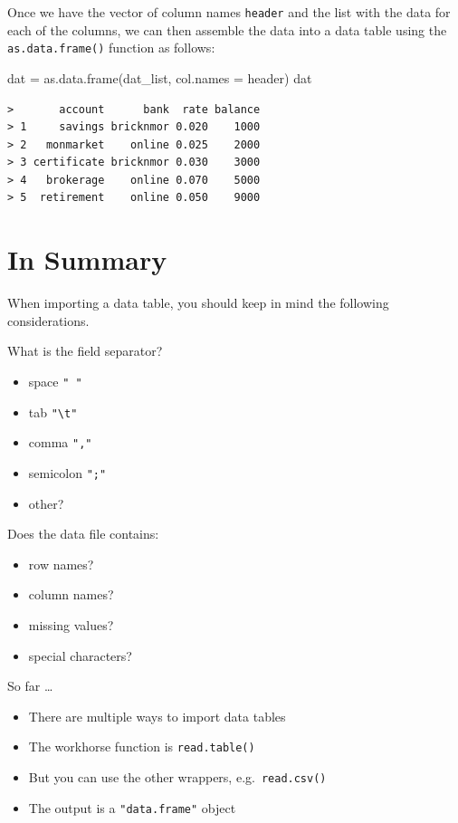 \documentclass[
]{book}
\newenvironment{Shaded}{\begin{snugshade}}{\end{snugshade}}
\newcommand{\AttributeTok}[1]{\textcolor[rgb]{0.77,0.63,0.00}{#1}}
\newcommand{\FunctionTok}[1]{\textcolor[rgb]{0.00,0.00,0.00}{#1}}
\newcommand{\NormalTok}[1]{#1}
\newcommand{\OtherTok}[1]{\textcolor[rgb]{0.56,0.35,0.01}{#1}}
\begin{document}
Once we have the vector of column names \texttt{header} and the list with the data
for each of the columns, we can then assemble the data into a data table using
the \texttt{as.data.frame()} function as follows:

\begin{Shaded}
\begin{Highlighting}[]
\NormalTok{dat }\OtherTok{=} \FunctionTok{as.data.frame}\NormalTok{(dat\_list, }\AttributeTok{col.names =}\NormalTok{ header)}
\NormalTok{dat}
\end{Highlighting}
\end{Shaded}

\begin{verbatim}
>       account      bank  rate balance
> 1     savings bricknmor 0.020    1000
> 2   monmarket    online 0.025    2000
> 3 certificate bricknmor 0.030    3000
> 4   brokerage    online 0.070    5000
> 5  retirement    online 0.050    9000
\end{verbatim}

\hypertarget{in-summary-1}{%
\section{In Summary}\label{in-summary-1}}

When importing a data table, you should keep in mind the following
considerations.

What is the field separator?

\begin{itemize}
\item
  space \texttt{"\ "}
\item
  tab \texttt{"\textbackslash{}t"}
\item
  comma \texttt{","}
\item
  semicolon \texttt{";"}
\item
  other?
\end{itemize}

Does the data file contains:

\begin{itemize}
\item
  row names?
\item
  column names?
\item
  missing values?
\item
  special characters?
\end{itemize}

So far \ldots{}

\begin{itemize}
\item
  There are multiple ways to import data tables
\item
  The workhorse function is \texttt{read.table()}
\item
  But you can use the other wrappers, e.g.~\texttt{read.csv()}
\item
  The output is a \texttt{"data.frame"} object
\end{itemize}
\end{document}
